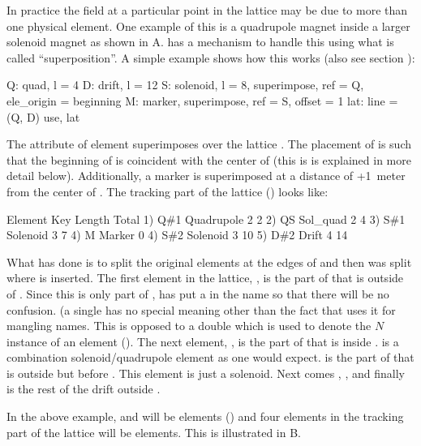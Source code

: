 In practice the field at a particular point in the lattice may be due to more than one physical
element. One example of this is a quadrupole magnet inside a larger solenoid magnet as shown in
A. \bmad has a mechanism to handle this using what is called ``superposition''. A
simple example shows how this works (also see section ):
\begin{example}
  Q: quad, l = 4
  D: drift, l = 12
  S: solenoid, l = 8, superimpose, ref = Q, ele_origin = beginning
  M: marker, superimpose, ref = S, offset = 1
  lat: line = (Q, D)
  use, lat
\end{example}
The  attribute of element  superimposes  over the lattice . The placement of  is such that the beginning of  is coincident with the center of
 (this is is explained in more detail below). Additionally, a marker  is superimposed at
a distance of +1~meter from the center of . The tracking part of the lattice
() looks like:
\begin{example}
        Element   Key         Length  Total     
  1)    Q{\#}1       Quadrupole   2        2
  2)    Q{\B}S       Sol_quad     2        4
  3)    S{\#}1       Solenoid     3        7
  4)    M         Marker       0      
  4)    S{\#}2       Solenoid     3       10
  5)    D{\#}2       Drift        4       14
\end{example}
What \bmad has done is to split the original elements  at the edges of  and then
 was split where  is inserted. The first element in the lattice, , is the part
of  that is outside of . Since this is only part of , \bmad has put a  in
the name so that there will be no confusion. (a single \vn{\#} has no special meaning other than the
fact that \bmad uses it for mangling names. This is opposed to a double \vn{\#\#} which is used to
denote the $N$\Th instance of an element (). The next element, , is the
part of  that is inside .  is a combination solenoid/quadrupole element as
one would expect.  is the part of  that is outside  but before . This
element is just a solenoid. Next comes , , and finally  is the rest of the
drift outside .

In the above example,  and  will be  elements () and
four elements in the tracking part of the lattice will be  elements. This is
illustrated in B.

